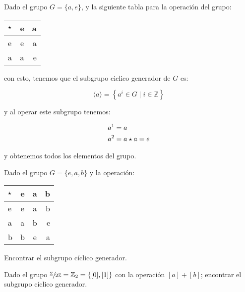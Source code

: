         \begin{ejemplo}
            Dado el grupo $G = \{a, e\}$, y la siguiente tabla para la operación del grupo:

            \begin{center}
                \begin{tabular}{l | c r}
                    $\star$ & e & a \\
                    \hline
                    e & e & a \\
                    a & a & e
                \end{tabular}
            \end{center}

            con esto, tenemos que el subgrupo ciclico generador de $G$ es:

            \begin{equation*}
                \langle a \rangle = \left\{ a^i \in G \mid i \in \mathbb{Z} \right\}
            \end{equation*}

            y al operar este subgrupo tenemos:

            \begin{align*}
                a^1 &= a  \\
                a^2 &= a \star a = e
            \end{align*}

            y obtenemos todos los elementos del grupo.
        \end{ejemplo}

        \begin{ejercicio}
            Dado el grupo $G = \{e, a, b\}$ y la operación:

            \begin{center}
                \begin{tabular}{l | c c r}
                    $\star$ & e & a & b \\
                    \hline
                    e & e & a & b \\
                    a & a & b & e \\
                    b & b & e & a
                \end{tabular}
            \end{center}

            Encontrar el subgrupo cíclico generador.
        \end{ejercicio}

        \begin{ejercicio}
            Dado el grupo $\sfrac{\mathbb{Z}}{2\mathbb{Z}} = \mathbb{Z}_2 = \left\{ [0], [1] \right\}$ con la operación $[a] + [b]$; encontrar el subgrupo cíclico generador.
        \end{ejercicio}

